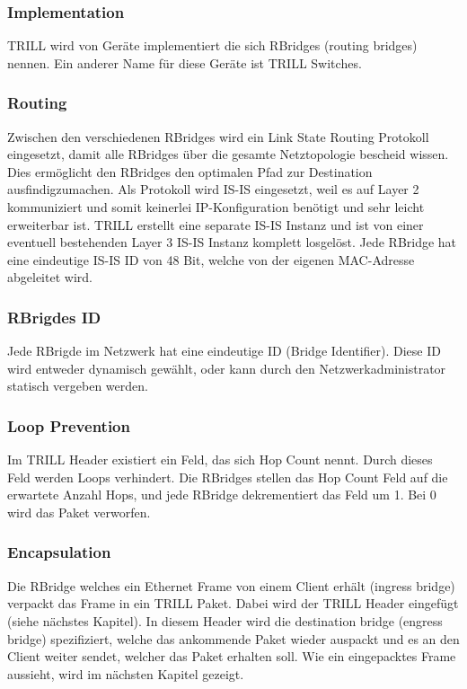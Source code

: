 \documentclass[a4,12pt]{scrartcl}
\begin{document}
\subsubsection{Implementation}
TRILL wird von Geräte implementiert die sich RBridges (routing bridges) nennen. Ein anderer Name für diese Geräte ist TRILL Switches. 

\subsubsection{Routing}
Zwischen den verschiedenen RBridges wird ein Link State Routing Protokoll eingesetzt, damit alle RBridges über die gesamte Netztopologie bescheid wissen. Dies ermöglicht den RBridges den optimalen Pfad zur Destination ausfindigzumachen. Als Protokoll wird IS-IS eingesetzt, weil es auf Layer 2 kommuniziert und somit keinerlei IP-Konfiguration benötigt und sehr leicht erweiterbar ist. TRILL erstellt eine separate IS-IS Instanz und ist von einer eventuell bestehenden Layer 3 IS-IS Instanz komplett losgelöst. Jede RBridge hat eine eindeutige IS-IS ID von 48 Bit, welche von der eigenen MAC-Adresse abgeleitet wird. 

\subsubsection{RBrigdes ID}
Jede RBrigde im Netzwerk hat eine eindeutige ID (Bridge Identifier). Diese ID wird entweder dynamisch gewählt, oder kann durch den Netzwerkadministrator statisch vergeben werden. 

\subsubsection{Loop Prevention}
Im TRILL Header existiert ein Feld, das sich Hop Count nennt. Durch dieses Feld werden Loops verhindert. Die RBridges stellen das Hop Count Feld auf die erwartete Anzahl Hops, und jede RBridge dekrementiert das Feld um 1. Bei 0 wird das Paket verworfen.  

\subsubsection{Encapsulation}
Die RBridge welches ein Ethernet Frame von einem Client erhält (ingress bridge) verpackt das Frame in ein TRILL Paket. Dabei wird der TRILL Header eingefügt (siehe nächstes Kapitel). In diesem Header wird die destination bridge (engress bridge) spezifiziert, welche das ankommende Paket wieder auspackt und es an den Client weiter sendet, welcher das Paket erhalten soll. Wie ein eingepacktes Frame aussieht, wird im nächsten Kapitel gezeigt. 
\end{document}
